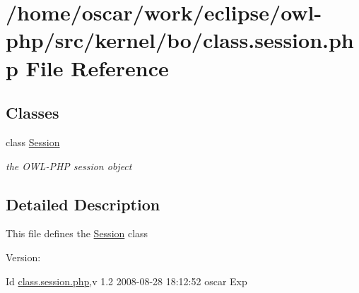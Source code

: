\hypertarget{class_8session_8php}{
\section{/home/oscar/work/eclipse/owl-php/src/kernel/bo/class.session.php File Reference}
\label{class_8session_8php}
}
\subsection*{Classes}
\begin{CompactItemize}
\item 
class \hyperlink{classSession}{Session}
\begin{CompactList}\small\item\em the OWL-PHP session object \item\end{CompactList}\end{CompactItemize}


\subsection{Detailed Description}
This file defines the \hyperlink{classSession}{Session} class \begin{Desc}
\item[Version:]\end{Desc}
\begin{Desc}
\item[Id]\hyperlink{class_8session_8php}{class.session.php},v 1.2 2008-08-28 18:12:52 oscar Exp \end{Desc}
